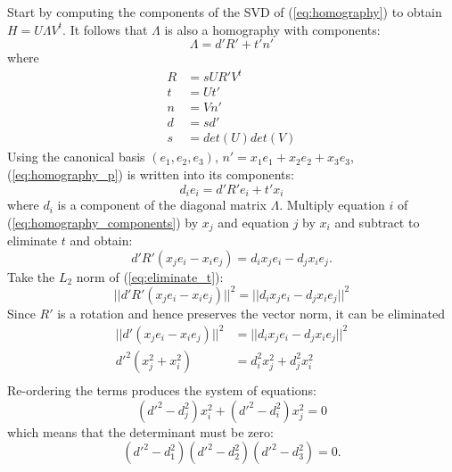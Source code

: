 \documentclass{article}
\begin{document}
Start by computing the components of the SVD of (\ref {eq:homography}) to obtain $H = U \Lambda V^t$. It follows that $\Lambda$ is also a homography with components:
%
\begin {equation} \label {eq:homography_p}
\Lambda = d' R' + t' n'
\end {equation}
%
where
%
\begin {equation}
\begin {aligned}
R &= s U R' V^t \\
t &= U t' \\
n &= V n' \\
d &= s d' \\
s &= det (U) det (V)
\end {aligned}
\end {equation}
%
Using the canonical basis $(e_1, e_2, e_3)$, $n' = x_1 e_1 + x_2 e_2 + x_3 e_3$, (\ref {eq:homography_p}) is written into its components:
%
\begin {equation} \label {eq:homography_components}
d_i e_i = d' R' e_i + t' x_i
\end {equation}
%
where $d_i$ is a component of the diagonal matrix $\Lambda$.
Multiply equation $i$ of (\ref {eq:homography_components}) by $x_j$ and equation $j$ by $x_i$ and subtract to eliminate $t$ and obtain:
%
\begin {equation} \label {eq:eliminate_t}
d' R' (x_j e_i - x_i e_j) = d_i x_j e_i - d_j x_i e_j.
\end {equation}
%
Take the $L_2$ norm of (\ref {eq:eliminate_t}):
%
\begin {equation}
||d' R' (x_j e_i - x_i e_j)||^2 = ||d_i x_j e_i - d_j x_i e_j||^2
\end {equation}
%
Since $R'$ is a rotation and hence preserves the vector norm, it can be eliminated
%
\begin {equation}
\begin {aligned}
||d' (x_j e_i - x_i e_j)||^2 &= ||d_i x_j e_i - d_j x_i e_j||^2 \\
d'^2 (x_j^2 + x_i^2) &= d_i^2 x_j^2 + d_j^2 x_i^2 \\
\end {aligned}
\end {equation}
%
Re-ordering the terms produces the system of equations:
%
\begin {equation}
\label {eq:system_of_equations}
(d'^2 - d_j^2) x_i^2 + (d'^2 - d_i^2) x_j^2 = 0
\end {equation}
%
which means that the determinant must be zero:
%
\begin {equation}
(d'^2 - d_1^2) (d'^2 - d_2^2) (d'^2 - d_3^2) = 0.
\end {equation}
\end{document}
